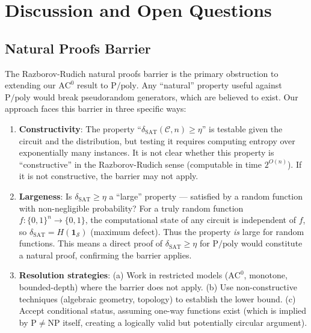 \documentclass[11pt]{article}
\theoremstyle{definition}
\theoremstyle{remark}
\newcommand{\calC}{\mathcal{C}}
\newcommand{\calS}{\mathcal{S}}
\newcommand{\Ppoly}{\mathrm{P/poly}}
\newcommand{\ACz}{\mathrm{AC}^0}
\newcommand{\dSAT}{\delta_{\mathrm{SAT}}}
\begin{document}
\section{Discussion and Open Questions}
\label{sec:discussion}

\subsection{Natural Proofs Barrier}

The Razborov-Rudich natural proofs barrier \cite{RR} is the primary
obstruction to extending our $\ACz$ result to $\Ppoly$.  Any
``natural'' property useful against $\Ppoly$ would break pseudorandom
generators, which are believed to exist.  Our approach faces this barrier
in three specific ways:

\begin{enumerate}
  \item \textbf{Constructivity}: The property ``$\dSAT(\calC, n) \geq \eta$''
    is testable given the circuit and the distribution, but testing it requires
    computing entropy over exponentially many instances.  It is not clear
    whether this property is ``constructive'' in the Razborov-Rudich sense
    (computable in time $2^{O(n)}$).  If it is not constructive, the barrier
    may not apply.

  \item \textbf{Largeness}: Is $\dSAT \geq \eta$ a ``large'' property ---
    satisfied by a random function with non-negligible probability?  For a
    truly random function $f: \{0,1\}^n \to \{0,1\}$, the computational state
    of any circuit is independent of $f$, so $\dSAT = H(\mathbf{1}_{\calS})$
    (maximum defect).  Thus the property \emph{is} large for random functions.
    This means a direct proof of $\dSAT \geq \eta$ for $\Ppoly$ would
    constitute a natural proof, confirming the barrier applies.

  \item \textbf{Resolution strategies}: (a) Work in restricted models
    ($\ACz$, monotone, bounded-depth) where the barrier does not apply.
    (b) Use non-constructive techniques (algebraic geometry, topology) to
    establish the lower bound. (c) Accept conditional status, assuming
    one-way functions exist (which is implied by $\mathrm{P} \neq \mathrm{NP}$
    itself, creating a logically valid but potentially circular argument).
\end{enumerate}
\end{document}

